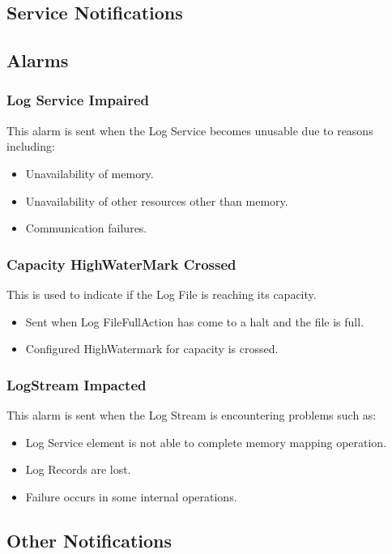 \begin{flushleft}
\begin{itemize}
\chapter{Service Notifications}
\section{Alarms}
\subsection{Log Service Impaired}
This alarm is sent when the Log Service becomes unusable due to reasons including:
\begin{itemize}
\item	Unavailability of memory.
\item	Unavailability of other resources other than memory.
\item	Communication failures.
\end{itemize}

\subsection{Capacity HighWaterMark Crossed}
This is used to indicate if the Log File is reaching its capacity.
\begin{itemize}
\item	Sent when Log FileFullAction has come to a halt and the file is full.
\item	Configured HighWatermark for capacity is crossed.
\end{itemize}

\subsection{LogStream Impacted}
 This alarm is sent when the Log Stream is encountering problems such as:
\begin{itemize}
\item	Log Service element is not able to complete memory mapping operation.
\item	Log Records are lost.
\item	Failure occurs in some internal operations.
\end{itemize}



\section{Other Notifications}

\end{itemize}
\end{flushleft}
